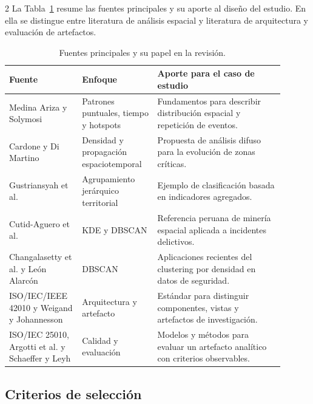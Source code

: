 \documentclass[10pt,twoside]{article}
\begin{document}
\begin{multicols}{2}
La Tabla~\ref{tab:fuentes} resume las fuentes principales y su aporte al diseño del estudio. En ella se distingue entre literatura de análisis espacial y literatura de arquitectura y evaluación de artefactos.

\begin{table}[H]
\centering
\caption{Fuentes principales y su papel en la revisión.}
\label{tab:fuentes}
\begingroup\footnotesize\setlength{\tabcolsep}{3pt}
\begin{tabular}{@{}>{\raggedright\arraybackslash}p{0.23\linewidth}>{\raggedright\arraybackslash}p{0.25\linewidth}>{\raggedright\arraybackslash}p{0.42\linewidth}@{}}
\toprule
\textbf{Fuente} & \textbf{Enfoque} & \textbf{Aporte para el caso de estudio} \\
\midrule
Medina Ariza y Solymosi \cite{medinaariza2023points,medinaariza2023time,medinaariza2023hotspots} & Patrones puntuales, tiempo y hotspots & Fundamentos para describir distribución espacial y repetición de eventos. \\
Cardone y Di Martino \cite{cardone2022fuzzyhotspot} & Densidad y propagación espaciotemporal & Propuesta de análisis difuso para la evolución de zonas críticas. \\
Gustriansyah et al. \cite{gustriansyah2022crime} & Agrupamiento jerárquico territorial & Ejemplo de clasificación basada en indicadores agregados. \\
Cutid-Aguero et al. \cite{cutid2025} & KDE y DBSCAN & Referencia peruana de minería espacial aplicada a incidentes delictivos. \\
Changalasetty et al. y León Alarcón \cite{changalasetty2023dbscan,leon2026dbscan} & DBSCAN & Aplicaciones recientes del clustering por densidad en datos de seguridad. \\
ISO/IEC/IEEE 42010 y Weigand y Johannesson \cite{iso42010_2022,weigand2023artifact} & Arquitectura y artefacto & Estándar para distinguir componentes, vistas y artefactos de investigación. \\
ISO/IEC 25010, Argotti et al. y Schaeffer y Leyh \cite{iso25010_2023,argotti2024quality,schaeffer2025evaluation} & Calidad y evaluación & Modelos y métodos para evaluar un artefacto analítico con criterios observables. \\
\bottomrule
\end{tabular}
\endgroup
\end{table}

\subsection{Criterios de selección}


\end{multicols}
\end{document}
